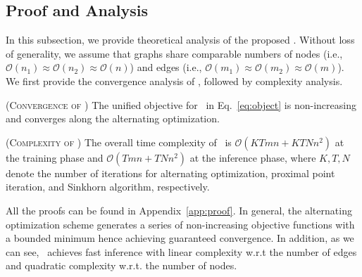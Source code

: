 \vspace{-5pt}
\subsection{Proof and Analysis}\label{subsec:proof}
In this subsection, we provide theoretical analysis of the proposed \algname. Without loss of generality, we assume that graphs share comparable numbers of nodes (i.e., $\mathcal{O}(n_1)\approx\mathcal{O}(n_2)\approx\mathcal{O}(n)$) and edges (i.e., $\mathcal{O}(m_1)\approx\mathcal{O}(m_2)\approx\mathcal{O}(m)$).
We first provide the convergence analysis of \algname, followed by complexity analysis.

\begin{theorem}
    {\normalfont \textsc{(Convergence of \algname)}} The unified objective for \algname\ in Eq.~\eqref{eq:object} is non-increasing and converges along the alternating optimization.
\label{theo:convergence}
\end{theorem}

\begin{proposition}\label{prop:complexity}
{\normalfont (\textsc{Complexity of \algname})} The overall time complexity of \algname\ is $\mathcal{O}\left(KTmn+KTNn^2\right)$ at the training phase and $\mathcal{O}\left(Tmn+TNn^2\right)$ at the inference phase, where $K, T, N$ denote the number of iterations for alternating optimization, proximal point iteration, and Sinkhorn algorithm, respectively.
\end{proposition}

All the proofs can be found in Appendix~\ref{app:proof}.
In general, the alternating optimization scheme generates a series of non-increasing objective functions with a bounded minimum hence achieving guaranteed convergence.
In addition, as we can see, \algname\ achieves fast inference with linear complexity w.r.t the number of edges and quadratic complexity w.r.t. the number of nodes.